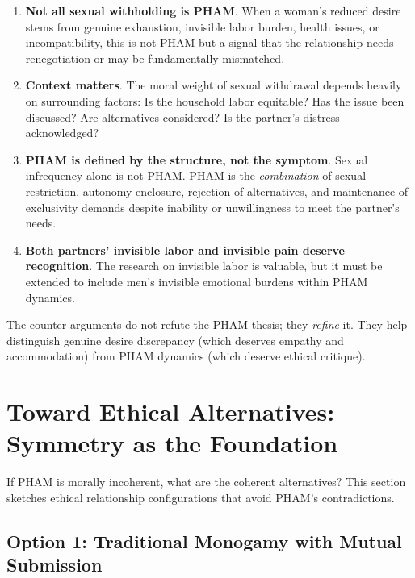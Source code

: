 \documentclass[12pt, letterpaper]{article}
\begin{document}
\begin{enumerate}
    \item \textbf{Not all sexual withholding is PHAM}. When a woman's reduced desire stems from genuine exhaustion, invisible labor burden, health issues, or incompatibility, this is not PHAM but a signal that the relationship needs renegotiation or may be fundamentally mismatched.
    
    \item \textbf{Context matters}. The moral weight of sexual withdrawal depends heavily on surrounding factors: Is the household labor equitable? Has the issue been discussed? Are alternatives considered? Is the partner's distress acknowledged?
    
    \item \textbf{PHAM is defined by the structure, not the symptom}. Sexual infrequency alone is not PHAM. PHAM is the \textit{combination} of sexual restriction, autonomy enclosure, rejection of alternatives, and maintenance of exclusivity demands despite inability or unwillingness to meet the partner's needs.
    
    \item \textbf{Both partners' invisible labor and invisible pain deserve recognition}. The research on invisible labor is valuable, but it must be extended to include men's invisible emotional burdens within PHAM dynamics.
\end{enumerate}

The counter-arguments do not refute the PHAM thesis; they \textit{refine} it. They help distinguish genuine desire discrepancy (which deserves empathy and accommodation) from PHAM dynamics (which deserve ethical critique).

\section{Toward Ethical Alternatives: Symmetry as the Foundation}

If PHAM is morally incoherent, what are the coherent alternatives? This section sketches ethical relationship configurations that avoid PHAM's contradictions.

\subsection{Option 1: Traditional Monogamy with Mutual Submission}
\end{document}
